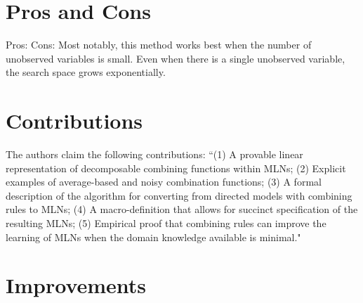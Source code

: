 \documentclass[letterpaper]{article}
\begin{document}
\section{Pros and Cons}

Pros:
Cons: Most notably, this method works best when the number of unobserved variables is small. Even when there is a single unobserved variable, the search space grows exponentially.

\section{Contributions}

The authors claim the following contributions: ``(1) A provable linear representation of decomposable combining functions within MLNs; (2) Explicit examples of average-based and noisy combination functions; (3) A formal description of the algorithm for converting from directed models with combining rules to MLNs; (4) A macro-definition that allows for succinct specification of the resulting MLNs; (5) Empirical proof that combining rules can improve the learning of MLNs when the domain knowledge available is minimal."

\section{Improvements}
\end{document}
